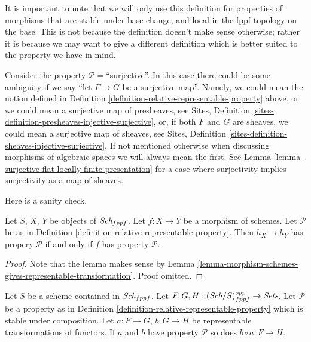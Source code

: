 \noindent
It is important to note that we will only use this definition for
properties of morphisms that are stable under base change, and
local in the fppf topology on the base. This is
not because the definition doesn't make sense otherwise; rather it
is because we may want to give a different definition which is
better suited to the property we have in mind.

\begin{remark}
\label{remark-warning}
Consider the property $\mathcal{P}=$``surjective''.
In this case there could be some ambiguity if we say
``let $F \to G$ be a surjective map''.
Namely, we could mean the notion defined
in Definition \ref{definition-relative-representable-property}
above, or we could mean a surjective map of presheaves, see
Sites, Definition \ref{sites-definition-presheaves-injective-surjective},
or, if both $F$ and $G$ are sheaves,
we could mean a surjective map of sheaves, see
Sites, Definition \ref{sites-definition-sheaves-injective-surjective},
If not mentioned otherwise when discussing morphisms of algebraic spaces
we will always mean the first. See
Lemma \ref{lemma-surjective-flat-locally-finite-presentation}
for a case where surjectivity implies surjectivity as a map of sheaves.
\end{remark}

\noindent
Here is a sanity check.

\begin{lemma}
\label{lemma-morphism-schemes-gives-representable-transformation-property}
Let $S$, $X$, $Y$ be objects of $\textit{Sch}_{fppf}$.
Let $f : X \to Y$ be a morphism of schemes.
Let $\mathcal{P}$ be as in
Definition \ref{definition-relative-representable-property}.
Then $h_X \longrightarrow h_Y$ has propery $\mathcal{P}$ if
and only if $f$ has property $\mathcal{P}$.
\end{lemma}

\begin{proof}
Note that the lemma makes sense by
Lemma \ref{lemma-morphism-schemes-gives-representable-transformation}.
Proof omitted.
\end{proof}

\begin{lemma}
\label{lemma-composition-representable-transformations-property}
Let $S$ be a scheme contained in $\textit{Sch}_{fppf}$.
Let $F, G, H : (\textit{Sch}/S)_{fppf}^{opp} \to \textit{Sets}$.
Let $\mathcal{P}$ be a property as in
Definition \ref{definition-relative-representable-property}
which is stable under composition.
Let $a : F \to G$, $b : G \to H$ be representable transformations of functors.
If $a$ and $b$ have property $\mathcal{P}$ so does
$b \circ a : F \longrightarrow H$.
\end{lemma}

